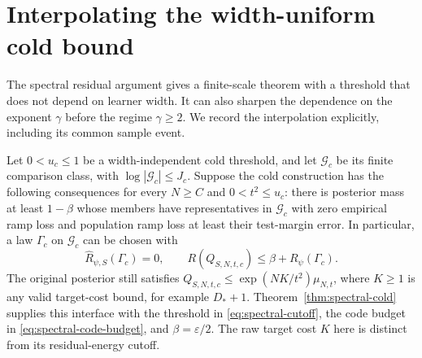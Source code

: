 \section{Interpolating the width-uniform cold bound}
\label{app:spectral-interpolation}

The spectral residual argument gives a finite-scale theorem with a
threshold that does not depend on learner width. It can also sharpen
the dependence on the exponent $\gamma$ before the regime $\gamma\ge2$.
We record the interpolation explicitly, including its common sample
event.

Let $0<u_c\le1$ be a width-independent cold threshold, and let
$\mathcal G_c$ be its finite comparison class, with
$\log|\mathcal G_c|\le J_c$. Suppose the cold construction has the
following consequences for every $N\ge C$ and $0<t^2\le u_c$:
there is posterior mass at least $1-\beta$ whose members have
representatives in $\mathcal G_c$ with zero empirical ramp loss and
population ramp loss at least their test-margin error. In particular,
a law $\Gamma_c$ on $\mathcal G_c$ can be chosen with
\begin{equation}\label{eq:spectral-cold-interface}
 \widehat R_{\psi,S}(\Gamma_c)=0,\qquad
 R(Q_{S,N,t,c})\le\beta+R_\psi(\Gamma_c).
\end{equation}
The original posterior still satisfies
$Q_{S,N,t,c}\le\exp(NK/t^2)\mu_{N,t}$, where $K\ge1$ is any
valid target-cost bound, for example $D_*+1$.
Theorem~\ref{thm:spectral-cold} supplies this interface with the
threshold in \eqref{eq:spectral-cutoff}, the code budget in
\eqref{eq:spectral-code-budget}, and $\beta=\varepsilon/2$. The raw
target cost $K$ here is distinct from its residual-energy cutoff.

